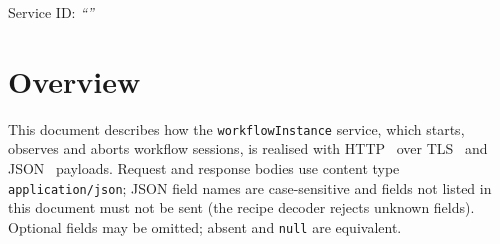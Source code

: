 \documentclass[a4paper]{arrowhead}
\begin{document}
\ArrowheadSetup

\begin{center}
  \vspace*{1cm}
  \huge{\arrowtitle}

  \vspace*{0.2cm}
  \LARGE{\arrowtype}
  \vspace*{1cm}

  \Large{Service ID: \textit{``\arrowid''}}
  \vspace*{\fill}

  

  \vspace*{1cm}
  \vspace*{\fill}

  \begin{abstract}
    This document describes the HTTP/TLS/JSON interface of the \texttt{workflow\allowbreak{}Instance} service of the Eclipse Arrowhead workflow support systems, service version 1.0.0, documentation edition 5.4.0. It realises the abstract operations of the \texttt{workflow\allowbreak{}Instance} SD.
  \end{abstract}

  \vspace*{1cm}
\end{center}

\newpage

\tableofcontents
\newpage

\section{Overview}
\label{sec:overview}
This document describes how the \texttt{workflow\allowbreak{}Instance} service, which starts, observes and aborts workflow sessions, is realised with HTTP~\cite{rfc9110}
over TLS~\cite{rfc8446} and JSON~\cite{rfc8259} payloads. Request and response bodies use content type
\texttt{application/\allowbreak{}json}; JSON field names are case-sensitive and fields not listed in this document must not be sent
(the recipe decoder rejects unknown fields). Optional fields may be omitted; absent and \texttt{null} are equivalent.
\end{document}
